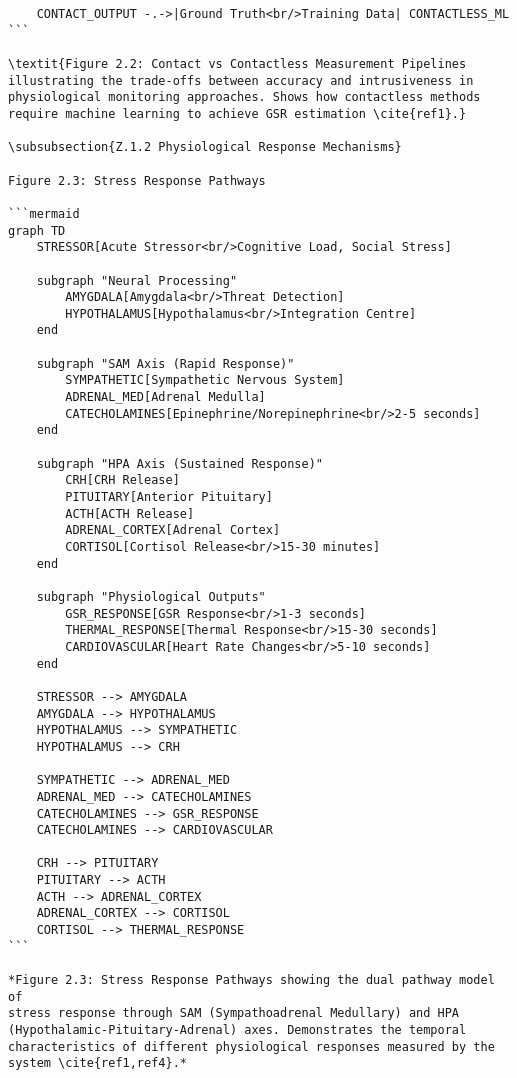 \begin{verbatim}
    CONTACT_OUTPUT -.->|Ground Truth<br/>Training Data| CONTACTLESS_ML
```

\textit{Figure 2.2: Contact vs Contactless Measurement Pipelines illustrating the trade-offs between accuracy and intrusiveness in physiological monitoring approaches. Shows how contactless methods require machine learning to achieve GSR estimation \cite{ref1}.}

\subsubsection{Z.1.2 Physiological Response Mechanisms}

Figure 2.3: Stress Response Pathways

```mermaid
graph TD
    STRESSOR[Acute Stressor<br/>Cognitive Load, Social Stress]

    subgraph "Neural Processing"
        AMYGDALA[Amygdala<br/>Threat Detection]
        HYPOTHALAMUS[Hypothalamus<br/>Integration Centre]
    end

    subgraph "SAM Axis (Rapid Response)"
        SYMPATHETIC[Sympathetic Nervous System]
        ADRENAL_MED[Adrenal Medulla]
        CATECHOLAMINES[Epinephrine/Norepinephrine<br/>2-5 seconds]
    end

    subgraph "HPA Axis (Sustained Response)"
        CRH[CRH Release]
        PITUITARY[Anterior Pituitary]
        ACTH[ACTH Release]
        ADRENAL_CORTEX[Adrenal Cortex]
        CORTISOL[Cortisol Release<br/>15-30 minutes]
    end

    subgraph "Physiological Outputs"
        GSR_RESPONSE[GSR Response<br/>1-3 seconds]
        THERMAL_RESPONSE[Thermal Response<br/>15-30 seconds]
        CARDIOVASCULAR[Heart Rate Changes<br/>5-10 seconds]
    end

    STRESSOR --> AMYGDALA
    AMYGDALA --> HYPOTHALAMUS
    HYPOTHALAMUS --> SYMPATHETIC
    HYPOTHALAMUS --> CRH

    SYMPATHETIC --> ADRENAL_MED
    ADRENAL_MED --> CATECHOLAMINES
    CATECHOLAMINES --> GSR_RESPONSE
    CATECHOLAMINES --> CARDIOVASCULAR

    CRH --> PITUITARY
    PITUITARY --> ACTH
    ACTH --> ADRENAL_CORTEX
    ADRENAL_CORTEX --> CORTISOL
    CORTISOL --> THERMAL_RESPONSE
```

*Figure 2.3: Stress Response Pathways showing the dual pathway model of
stress response through SAM (Sympathoadrenal Medullary) and HPA
(Hypothalamic-Pituitary-Adrenal) axes. Demonstrates the temporal
characteristics of different physiological responses measured by the
system \cite{ref1,ref4}.*


\end{verbatim}
